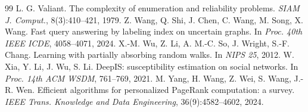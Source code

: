 \documentclass[11pt,a4paper]{article}
\begin{document}
\begin{thebibliography}{99}
 L. G. Valiant. The complexity of enumeration and reliability
problems. \emph{SIAM J. Comput.}, 8(3):410--421, 1979.
 Z. Wang, Q. Shi, J. Chen, C. Wang, M. Song, X. Wang. Fast
query answering by labeling index on uncertain graphs. In \emph{Proc. 40th
IEEE ICDE}, 4058--4071, 2024.
 X.-M. Wu, Z. Li, A. M.-C. So, J. Wright, S.-F. Chang. Learning
with partially absorbing random walks. In \emph{NIPS 25}, 2012.
 W. Xia, Y. Li, J. Wu, S. Li. DeepIS: susceptibility
estimation on social networks. In \emph{Proc. 14th ACM WSDM}, 761--769,
2021.
 M. Yang, H. Wang, Z. Wei, S. Wang, J.-R. Wen. Efficient
algorithms for personalized PageRank computation: a survey. \emph{IEEE
Trans. Knowledge and Data Engineering}, 36(9):4582--4602, 2024.
\end{thebibliography}
\end{document}
